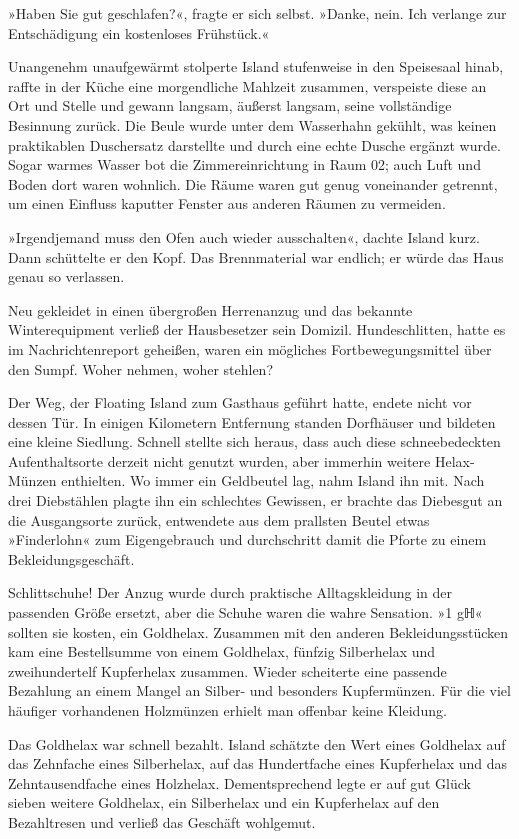 »Haben Sie gut geschlafen?«, fragte er sich selbst. »Danke, nein. Ich verlange zur Entschädigung ein kostenloses Frühstück.«

Unangenehm unaufgewärmt stolperte Island stufenweise in den Speisesaal hinab, raffte in der Küche eine morgendliche Mahlzeit zusammen, verspeiste diese an Ort und Stelle und gewann langsam, äußerst langsam, seine vollständige Besinnung zurück. Die Beule wurde unter dem Wasserhahn gekühlt, was keinen praktikablen Duschersatz darstellte und durch eine echte Dusche ergänzt wurde. Sogar warmes Wasser bot die Zimmereinrichtung in Raum 02; auch Luft und Boden dort waren wohnlich. Die Räume waren gut genug voneinander getrennt, um einen Einfluss kaputter Fenster aus anderen Räumen zu vermeiden.

»Irgendjemand muss den Ofen auch wieder ausschalten«, dachte Island kurz. Dann schüttelte er den Kopf. Das Brennmaterial war endlich; er würde das Haus genau so verlassen.

Neu gekleidet in einen übergroßen Herrenanzug und das bekannte Winterequipment verließ der Hausbesetzer sein Domizil. Hundeschlitten, hatte es im Nachrichtenreport geheißen, waren ein mögliches Fortbewegungsmittel über den Sumpf. Woher nehmen, woher stehlen?

Der Weg, der Floating Island zum Gasthaus geführt hatte, endete nicht vor dessen Tür. In einigen Kilometern Entfernung standen Dorfhäuser und bildeten eine kleine Siedlung. Schnell stellte sich heraus, dass auch diese schneebedeckten Aufenthaltsorte derzeit nicht genutzt wurden, aber immerhin weitere Helax-Münzen enthielten. Wo immer ein Geldbeutel lag, nahm Island ihn mit. Nach drei Diebstählen plagte ihn ein schlechtes Gewissen, er brachte das Diebesgut an die Ausgangsorte zurück, entwendete aus dem prallsten Beutel etwas »Finderlohn« zum Eigengebrauch und durchschritt damit die Pforte zu einem Bekleidungsgeschäft.

Schlittschuhe! Der Anzug wurde durch praktische Alltagskleidung in der passenden Größe ersetzt, aber die Schuhe waren die wahre Sensation. »1 gℍ« sollten sie kosten, ein Goldhelax. Zusammen mit den anderen Bekleidungsstücken kam eine Bestellsumme von einem Goldhelax, fünfzig Silberhelax und zweihundertelf Kupferhelax zusammen. Wieder scheiterte eine passende Bezahlung an einem Mangel an Silber- und besonders Kupfermünzen. Für die viel häufiger vorhandenen Holzmünzen erhielt man offenbar keine Kleidung.

Das Goldhelax war schnell bezahlt. Island schätzte den Wert eines Goldhelax auf das Zehnfache eines Silberhelax, auf das Hundertfache eines Kupferhelax und das Zehntausendfache eines Holzhelax. Dementsprechend legte er auf gut Glück sieben weitere Goldhelax, ein Silberhelax und ein Kupferhelax auf den Bezahltresen und verließ das Geschäft wohlgemut.

